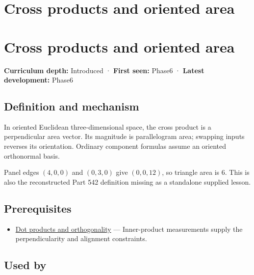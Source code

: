 \hypertarget{appendix-2391db8052b1}{}
\section*{Cross products and oriented area}
\section{Cross products and oriented area}\label{appendix-2391db8052b1-cross-products-and-oriented-area}

\textbf{Curriculum depth:} Introduced · \textbf{First seen:} Phase6 · \textbf{Latest development:} Phase6

\subsection{Definition and mechanism}\label{appendix-2391db8052b1-definition-and-mechanism}

In oriented Euclidean three-dimensional space, the cross product is a perpendicular area vector. Its magnitude is parallelogram area; swapping inputs reverses its orientation. Ordinary component formulas assume an oriented orthonormal basis.

Panel edges \((4,0,0)\) and \((0,3,0)\) give \((0,0,12)\), so triangle area is \(6\). This is also the reconstructed Part 542 definition missing as a standalone supplied lesson.

\subsection{Prerequisites}\label{appendix-2391db8052b1-prerequisites}

\begin{itemize}
\tightlist
\item
  \hyperref[appendix-8bc4e8fc547c]{Dot products and orthogonality} --- Inner-product measurements supply the perpendicularity and alignment constraints.
\end{itemize}

\subsection{Used by}\label{appendix-2391db8052b1-used-by}

